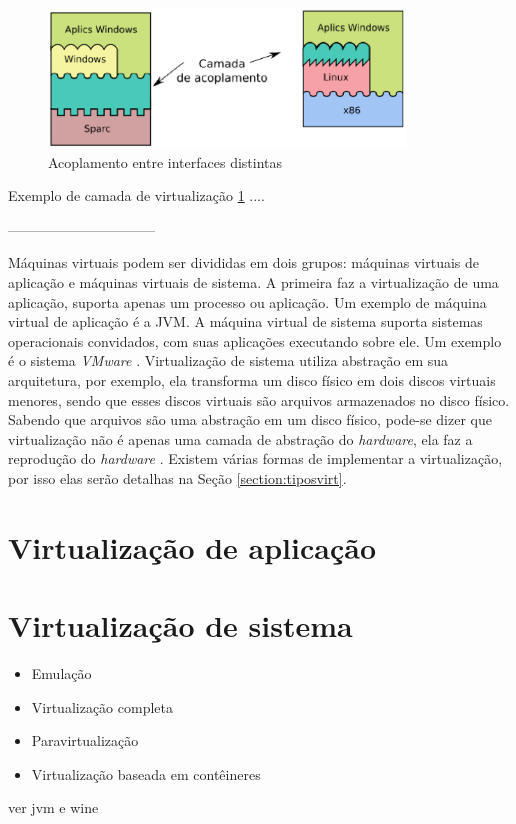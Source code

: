 \begin{figure}[acoplamento_interfaces]
 \centering
 \includegraphics[height=140px]{img/acoplamento_interfaces.eps}
 \caption{Acoplamento entre interfaces distintas}
 \label{fig:acoplamento_interfaces}
\end{figure}
Exemplo de camada de virtualização \ref{fig:acoplamento_interfaces} ....


--------------------------------


Máquinas virtuais podem ser divididas em dois grupos: máquinas virtuais de aplicação e máquinas virtuais de sistema. A primeira faz a
virtualização de uma aplicação, suporta apenas um processo ou aplicação. Um exemplo de máquina virtual de aplicação é a \ac{JVM}. 
A máquina virtual de sistema suporta sistemas operacionais convidados, com suas aplicações executando sobre ele. Um exemplo é o sistema
\textit{VMware} \cite{laureano2008}.
Virtualização de sistema utiliza abstração em sua arquitetura, por exemplo, ela transforma um disco físico em dois discos 
virtuais menores, sendo que esses discos virtuais são arquivos armazenados no disco físico. Sabendo que arquivos são uma abstração
em um disco físico, pode-se dizer que virtualização não é apenas uma camada de abstração do \textit{hardware}, ela faz a reprodução 
do \textit{hardware} \cite{smithenair2005}.
Existem várias formas de implementar a virtualização, por isso elas serão detalhas na Seção \ref{section:tiposvirt}.

\section{Virtualização de aplicação}
\label{section:virtaplicacao}


\section{Virtualização de sistema}
\label{section:virtsistema}


\begin{itemize}
 \item Emulação
 \item Virtualização completa
 \item Paravirtualização
 \item Virtualização baseada em contêineres
\end{itemize}
ver jvm e wine

